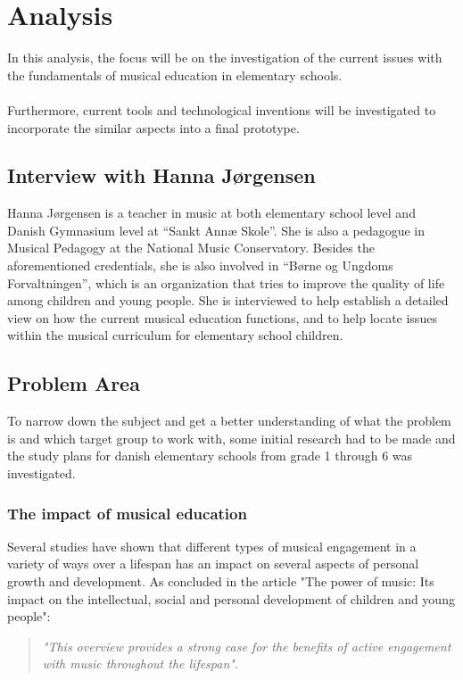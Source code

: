 \chapter{Analysis}
In this analysis, the focus will be on the investigation of the current issues with the fundamentals of musical education in elementary schools.\\
\\
Furthermore, current tools and technological inventions will be investigated to incorporate the similar aspects into a final prototype.

\section{Interview with Hanna Jørgensen}
Hanna Jørgensen is a teacher in music at both elementary school level and Danish Gymnasium level at “Sankt Annæ Skole”. She is also a pedagogue in Musical Pedagogy at the National Music Conservatory. Besides the aforementioned credentials, she is also involved in “Børne og Ungdoms Forvaltningen”, which is an organization that tries to improve the quality of life among children and young people. She is interviewed to help establish a detailed view on how the current musical education functions, and to help locate issues within the musical curriculum for elementary school children.



\section{Problem Area}
	To narrow down the subject and get a better understanding of what the problem is and which target group to work with, some initial research had to be made and the study plans for danish elementary schools from grade 1 through 6 was investigated.\\
	
	\subsection{The impact of musical education}
	Several studies have shown that different types of musical engagement in a variety of ways over a lifespan has an impact on several aspects of personal growth and development. As concluded in the article "The power of music: Its impact on the intellectual, social and personal development of children and young people":\\
	
	\begin{quote}
		\textit{"This overview provides a strong case for the benefits of active engagement with music throughout the lifespan"}\cite{powerOfMusic}\label{quote:powerOfMusic}.\\
	\end{quote}
	
